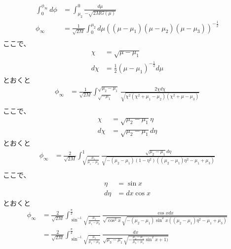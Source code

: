 \documentclass[dvipdfmx]{report} %
\begin{document}
\begin{equation*}
\begin{split}
	\int^{\phi_\infty}_0 d\phi &= \int^{0}_{\mu_2} \frac{d\mu}{- \sqrt{2MG(\mu)}}\\
	\phi_{\infty} &= \frac{1}{\sqrt{2M}} \int^{\mu_2}_{0} d\mu \left( (\mu - \mu_1)(\mu - \mu_2)(\mu - \mu_3) \right)^{- \frac{1}{2}}\\
\end{split}
\end{equation*}
ここで、
\begin{equation*}
\begin{split}
	\chi &= \sqrt{\mu - \mu_1}\\
	d\chi &= \frac{1}{2}(\mu - \mu_1)^{- \frac{1}{2}} d\mu
\end{split}
\end{equation*}
とおくと
\begin{equation*}
\begin{split}
	\phi_{\infty} &= \frac{1}{\sqrt{2M}} \int^{\sqrt{\mu_2 - \mu_1}}_{\sqrt{-\mu_1}} \frac{ 2\chi d\chi }{\sqrt{ \chi^2(\chi^2 + \mu_1 - \mu_2)(\chi^2 + \mu - \mu_3) }}\\
\end{split}
\end{equation*}
ここで、
\begin{equation*}
\begin{split}
	\chi &= \sqrt{\mu_2 - \mu_1}\eta\\
	d\chi &= \sqrt{\mu_2 - \mu_1}d\eta
\end{split}
\end{equation*}
とおくと
\begin{equation*}
\begin{split}
	\phi_{\infty} &= \frac{2}{\sqrt{2M}} \int^{1}_{\sqrt{\frac{\mu_1}{\mu_1 - \mu_2}}} \frac{ \sqrt{\mu_2 - \mu_1} d\eta }{\sqrt{ -(\mu_2 - \mu_1)(1 - \eta^2)((\mu_2 - \mu_1)\eta^2 - \mu_1 + \mu_3) }}\\
\end{split}
\end{equation*}
ここで、
\begin{equation*}
\begin{split}
	\eta &= \sin x\\
	d\eta &= dx \cos x
\end{split}
\end{equation*}
とおくと
\begin{equation*}
\begin{split}
	\phi_{\infty} &= \frac{2}{\sqrt{2M}} \int^{\frac{\pi}{2}}_{\sin^{-1}\sqrt{\frac{\mu_1}{\mu_1 - \mu_2}}} \frac{ \cos x dx }{\sqrt{\cos^2 x} \sqrt{ -(\mu_2 - \mu_1)\sin^2 x((\mu_2 - \mu_1)\eta^2 - \mu_1 + \mu_3) }}\\
	&= \frac{2}{\sqrt{2M}} \int^{\frac{\pi}{2}}_{\sin^{-1}\sqrt{\frac{\mu_1}{\mu_1 - \mu_2}}} \frac{ dx }{ \sqrt{\mu_3 - \mu_1} \sqrt{ - \frac{\mu_2 - \mu_1}{\mu_3 - \mu_1}\sin^2 x + 1) }}\\
\end{split}
\end{equation*}
\end{document}
